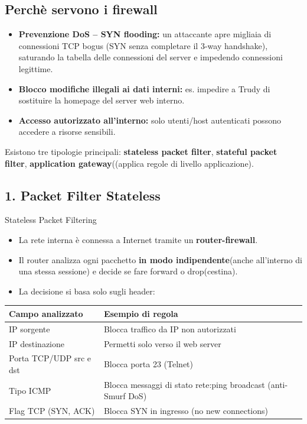 \documentclass[a4paper,12pt]{report}
\begin{document}
\subsection{Perchè servono i firewall}
\begin{urgentbox}
    
\begin{itemize}[noitemsep]
  \item \textbf{Prevenzione DoS -- SYN flooding:}
        un attaccante apre migliaia di connessioni TCP bogus (SYN senza completare
        il 3-way handshake), saturando la tabella delle connessioni del server
        e impedendo connessioni legittime.
  \item \textbf{Blocco modifiche illegali ai dati interni:}
        es. impedire a Trudy di sostituire la homepage del server web interno.
  \item \textbf{Accesso autorizzato all'interno:}
        solo utenti/host autenticati possono accedere a risorse sensibili.
\end{itemize}
Esistono tre tipologie principali: \textbf{stateless packet filter},
\textbf{stateful packet filter}, \textbf{application gateway}((applica regole di livello applicazione).
\end{urgentbox}

\subsection{1. Packet Filter Stateless}


\begin{defbox}{Stateless Packet Filtering}
\begin{itemize}[noitemsep]
  \item La rete interna \`e connessa a Internet tramite un \textbf{router-firewall}.
  \item Il router analizza ogni pacchetto \textbf{in modo indipendente}(anche all'interno di una stessa sessione) e decide
        se fare forward o drop(cestina).
  \item La decisione si basa solo sugli header:
\end{itemize}
\begin{center}
\small
\setlength{\tabcolsep}{3pt}
\begin{tabular}{ll}
\toprule
\textbf{Campo analizzato} & \textbf{Esempio di regola} \\
\midrule
IP sorgente & Blocca traffico da IP non autorizzati \\
IP destinazione & Permetti solo verso il web server \\
Porta TCP/UDP src e dst & Blocca porta 23 (Telnet) \\
Tipo ICMP & Blocca messaggi di stato rete:ping broadcast (anti-Smurf DoS) \\
Flag TCP (SYN, ACK) & Blocca SYN in ingresso (no new connections) \\
\bottomrule
\end{tabular}
\end{center}
\end{defbox}
\end{document}
